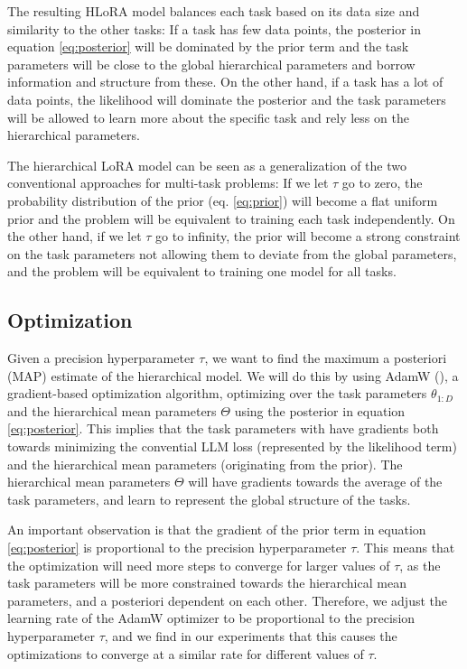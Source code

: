 \documentclass{article}
\begin{document}
The resulting HLoRA model balances each task based on its data size and similarity to the other tasks: If a task has few data points, the posterior in equation \ref{eq:posterior} will be dominated by the prior term and the task parameters will be close to the global hierarchical parameters and borrow information and structure from these. On the other hand, if a task has a lot of data points, the likelihood will dominate the posterior and the task parameters will be allowed to learn more about the specific task and rely less on the hierarchical parameters.

The hierarchical LoRA model can be seen as a generalization of the two conventional approaches for multi-task problems:
If we let $\tau$ go to zero, the probability distribution of the prior (eq. \ref{eq:prior}) will become a flat uniform prior and the problem will be equivalent to training each task independently. On the other hand, if we let $\tau$ go to infinity, the prior will become a strong constraint on the task parameters not allowing them to deviate from the global parameters, and the problem will be equivalent to training one model for all tasks.

\subsection{Optimization}
Given a precision hyperparameter $\tau$, we want to find the maximum a posteriori (MAP) estimate of the hierarchical model. 
We will do this by using AdamW (\cite{adamW}), a gradient-based optimization algorithm, optimizing over the task parameters $\theta_{1:D}$ and the hierarchical mean parameters $\Theta$ using the posterior in equation \ref{eq:posterior}.
This implies that the task parameters with have gradients both towards minimizing the convential LLM loss (represented by the likelihood term) and the hierarchical mean parameters (originating from the prior). The hierarchical mean parameters $\Theta$ will have gradients towards the average of the task parameters, and learn to represent the global structure of the tasks.

An important observation is that the gradient of the prior term in equation \ref{eq:posterior} is proportional to the precision hyperparameter $\tau$. This means that the optimization will need more steps to converge for larger values of $\tau$, as the task parameters will be more constrained towards the hierarchical mean parameters, and a posteriori dependent on each other.
Therefore, we adjust the learning rate of the AdamW optimizer to be proportional to the precision hyperparameter $\tau$, and we find in our experiments that this causes the optimizations to converge at a similar rate for different values of $\tau$.
\end{document}
